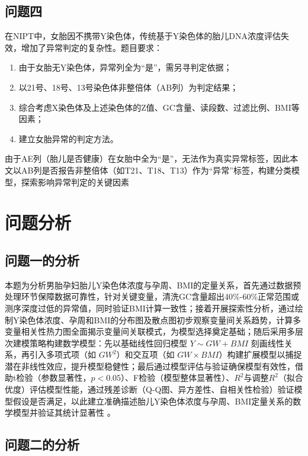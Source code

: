 \documentclass[withoutpreface,bwprint]{cumcmthesis} %
\begin{document}
\subsection{问题四}
在NIPT中，女胎因不携带Y染色体，传统基于Y染色体的胎儿DNA浓度评估失效，增加了异常判定的复杂性。题目要求：
\begin{enumerate}
    \item 由于女胎无Y染色体，异常列全为“是”，需另寻判定依据；
    \item 以21号、18号、13号染色体非整倍体（AB列）为判定结果；
    \item 综合考虑X染色体及上述染色体的Z值、GC含量、读段数、过滤比例、BMI等因素；
    \item 建立女胎异常的判定方法。
\end{enumerate}


由于AE列（胎儿是否健康）在女胎中全为“是”，无法作为真实异常标签，因此本文以AB列是否报告非整倍体（如T21、T18、T13）作为“异常”标签，构建分类模型，探索影响异常判定的关键因素

\section{问题分析}
\subsection{问题一的分析}

本题为分析男胎孕妇胎儿Y染色体浓度与孕周、BMI的定量关系，首先通过数据预处理环节保障数据可靠性，针对关键变量，清洗GC含量超出40\%-60\%正常范围或测序深度过低的异常值，同时验证BMI计算一致性；接着开展探索性分析，通过绘制Y染色体浓度、孕周和BMI的分布图及散点图初步观察变量间关系趋势，计算多变量相关性热力图全面揭示变量间关联模式，为模型选择奠定基础；随后采用多层次建模策略构建数学模型：先以基础线性回归模型 $Y \sim GW + BMI$ 刻画线性关系，再引入多项式项（如 $GW^2$）和交互项（如 $GW \times BMI$）构建扩展模型以捕捉潜在非线性效应，提升模型稳健性；最后通过模型评估与验证确保模型有效性，借助t检验（参数显著性，$p<0.05$）、F检验（模型整体显著性）、$R^2$与调整$R^2$（拟合优度）评估模型性能，通过残差诊断（Q-Q图、异方差性、自相关性检验）验证模型假设是否满足，以此建立准确描述胎儿Y染色体浓度与孕周、BMI定量关系的数学模型并验证其统计显著性 。

\subsection{问题二的分析}
\end{document}
